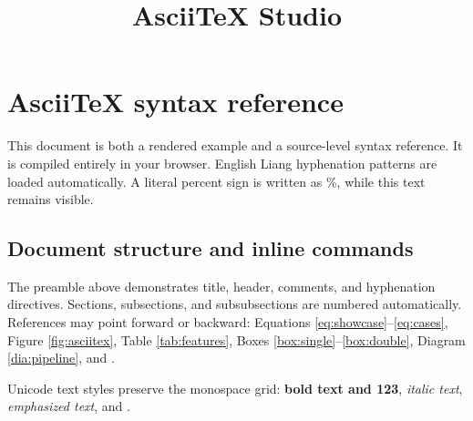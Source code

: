 
\title{AsciiTeX Studio}

\section{AsciiTeX syntax reference}
This document is both a rendered example and a source-level syntax reference. It is
compiled entirely in your browser. English Liang hyphenation patterns are loaded
automatically. A literal percent sign is written as \%, while this text remains visible. %

\subsection{Document structure and inline commands}
The preamble above demonstrates title, header, comments, and hyphenation directives.
Sections, subsections, and subsubsections are numbered automatically. References may
point forward or backward: Equations
\ref{eq:showcase}--\ref{eq:cases}, Figure \ref{fig:asciitex}, Table \ref{tab:features},
Boxes \ref{box:single}--\ref{box:double}, Diagram \ref{dia:pipeline}, and \cite{knuth1981}.

Unicode text styles preserve the monospace grid: \textbf{bold text and 123},
\textit{italic text}, \emph{emphasized text}, and .

